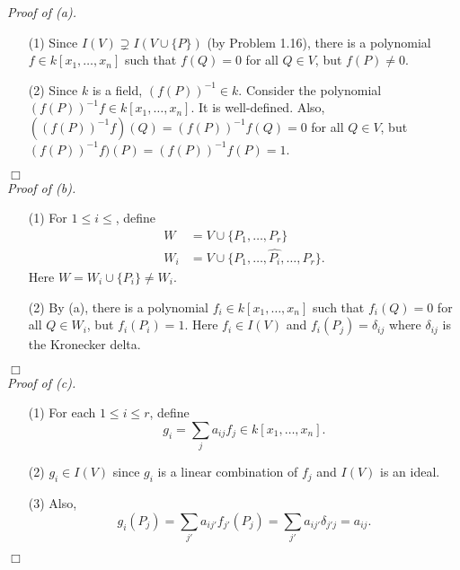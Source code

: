 \documentclass{article}
\begin{document}
\emph{Proof of (a).}
\begin{enumerate}
\item[(1)]
  Since $I(V) \supsetneq I(V \cup \{P\})$ (by Problem 1.16),
  there is a polynomial $f \in k[x_1,\ldots,x_n]$ such that $f(Q) = 0$ for all $Q \in V$, but $f(P) \neq 0$.

\item[(2)]
  Since $k$ is a field, $(f(P))^{-1} \in k$.
  Consider the polynomial $(f(P))^{-1} f \in k[x_1,\ldots,x_n]$.
  It is well-defined.
  Also, $((f(P))^{-1} f)(Q) = (f(P))^{-1}f(Q) = 0$ for all $Q \in V$,
  but $(f(P))^{-1} f)(P) = (f(P))^{-1} f(P) = 1$.
\end{enumerate}
$\Box$ \\



\emph{Proof of (b).}
\begin{enumerate}
\item[(1)]
  For $1 \leq i \leq$,
  define
  \begin{align*}
    W &= V \cup \{ P_1, \ldots, P_r \} \\
    W_i &= V \cup \{ P_1, \ldots, \widehat{P_i}, \ldots, P_r \}.
  \end{align*}
  Here $W = W_i \cup \{P_i\} \neq W_i$.

\item[(2)]
  By (a), there is a polynomial $f_i \in k[x_1,\ldots,x_n]$ such that $f_i(Q) = 0$
  for all $Q \in W_i$, but $f_i(P_i) = 1$.
  Here $f_i \in I(V)$ and $f_i(P_j) = \delta_{ij}$
  where $\delta_{ij}$ is the Kronecker delta.
\end{enumerate}
$\Box$ \\



\emph{Proof of (c).}
\begin{enumerate}
\item[(1)]
  For each $1 \leq i \leq r$,
  define
  \[
    g_i = \sum_{j} a_{ij} f_j \in k[x_1,\ldots,x_n].
  \]

\item[(2)]
  $g_i \in I(V)$ since $g_i$ is a linear combination of $f_j$ and $I(V)$ is an ideal.

\item[(3)]
  Also,
  \[
    g_i(P_j)
    = \sum_{j'} a_{ij'} f_{j'}(P_j)
    = \sum_{j'} a_{ij'} \delta_{j'j}
    = a_{ij}.
  \]
\end{enumerate}
$\Box$ \\\\
\end{document}
